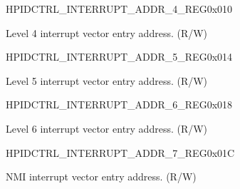     
    \begin{register}{H}{PIDCTRL\_INTERRUPT\_ADDR\_4\_REG}{0x010}\label{regdesc:PIDCTRLINTERRUPTADDR4REG}
    \regnewline%
    \begin{regdesc}\begin{reglist}
    \item [PIDCTRL\_INTERRUPT\_ADDR\_4\_REG]Level 4 interrupt vector entry address. (R/W)
    \end{reglist}\end{regdesc}
    \end{register}
    
    
    \begin{register}{H}{PIDCTRL\_INTERRUPT\_ADDR\_5\_REG}{0x014}\label{regdesc:PIDCTRLINTERRUPTADDR5REG}
    \regnewline%
    \begin{regdesc}\begin{reglist}
    \item [PIDCTRL\_INTERRUPT\_ADDR\_5\_REG]Level 5 interrupt vector entry address. (R/W)
    \end{reglist}\end{regdesc}
    \end{register}
    
    
    \begin{register}{H}{PIDCTRL\_INTERRUPT\_ADDR\_6\_REG}{0x018}\label{regdesc:PIDCTRLINTERRUPTADDR6REG}
    \regnewline%
    \begin{regdesc}\begin{reglist}
    \item [PIDCTRL\_INTERRUPT\_ADDR\_6\_REG]Level 6 interrupt vector entry address. (R/W)
    \end{reglist}\end{regdesc}
    \end{register}
    
    
    \begin{register}{H}{PIDCTRL\_INTERRUPT\_ADDR\_7\_REG}{0x01C}\label{regdesc:PIDCTRLINTERRUPTADDR7REG}
    \regnewline%
    \begin{regdesc}\begin{reglist}
    \item [PIDCTRL\_INTERRUPT\_ADDR\_7\_REG]NMI interrupt vector entry address. (R/W)
    \end{reglist}\end{regdesc}
    \end{register}
    
